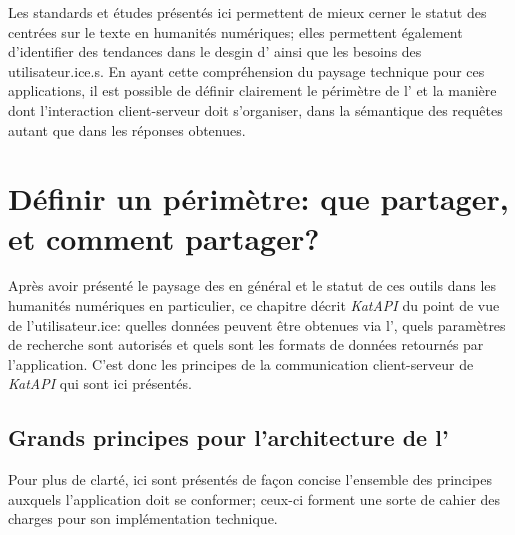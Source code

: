 Les standards et études présentés ici permettent de mieux cerner le statut des \api{} centrées sur le texte en humanités numériques; elles permettent également d'identifier des tendances dans le desgin d'\api{} ainsi que les besoins des utilisateur.ice.s. En ayant cette compréhension du paysage technique pour ces applications, il est possible de définir clairement le périmètre de l'\api{} et la manière dont l'interaction client-serveur doit s'organiser, dans la sémantique des requêtes autant que dans les réponses obtenues.

\chapter{Définir un périmètre: que partager, et comment partager?}
Après avoir présenté le paysage des \api{} en général et le statut de ces outils dans les humanités numériques en particulier, ce chapitre décrit \textit{KatAPI} du point de vue de l'utilisateur.ice: quelles données peuvent être obtenues via l'\api{}, quels paramètres de recherche sont autorisés et quels sont les formats de données retournés par l'application. C'est donc les principes de la communication client-serveur de \textit{KatAPI} qui sont ici présentés.

\section{Grands principes pour l'architecture de l'\api{}}
Pour plus de clarté, ici sont présentés de façon concise l'ensemble des principes auxquels l'application doit se conformer; ceux-ci forment une sorte de cahier des charges pour son implémentation technique.

